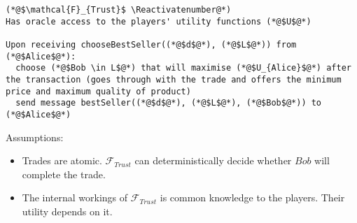 \Suppressnumber
\begin{lstlisting}[label=trustfunc, style=numbers]
(*@$\mathcal{F}_{Trust}$ \Reactivatenumber@*)
Has oracle access to the players' utility functions (*@$U$@*)

Upon receiving chooseBestSeller((*@$d$@*), (*@$L$@*)) from (*@$Alice$@*):
  choose (*@$Bob \in L$@*) that will maximise (*@$U_{Alice}$@*) after the transaction (goes through with the trade and offers the minimum price and maximum quality of product)
  send message bestSeller((*@$d$@*), (*@$L$@*), (*@$Bob$@*)) to (*@$Alice$@*)
\end{lstlisting}

Assumptions:
\begin{itemize}
  \item Trades are atomic. $\mathcal{F}_{Trust}$ can deterministically decide whether
  $Bob$ will complete the trade.
  \item The internal workings of $\mathcal{F}_{Trust}$ is common knowledge to the players.
  Their utility depends on it.
\end{itemize}

